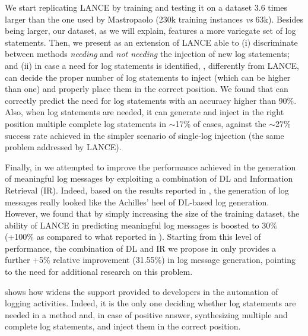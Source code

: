 We start replicating LANCE by training and testing it on a dataset 3.6 times larger than the one used by Mastropaolo \etal \cite{mastropaolo2022using} (230k training instances \emph{vs} 63k). Besides being larger, our dataset, as we will explain, features a more variegate set of log statements. Then, we present \approach as an extension of LANCE able to (i) discriminate between methods \emph{needing} and \emph{not needing} the injection of new log statements; and (ii) in case a need for log statements is identified, \approach, differently from LANCE, can decide the proper number of log statements to inject (which can be higher than one) and properly place them in the correct position. We found that \approach can correctly predict the need for log statements with an accuracy higher than 90\%. Also, when log statements are needed, it can generate and inject in the right position multiple complete log statements in $\sim$17\% of cases, against the $\sim$27\% success rate achieved in the simpler scenario of single-log injection (\ie the same problem addressed by LANCE).   

Finally, in \approach we attempted to improve the performance achieved in the generation of meaningful log messages by exploiting a combination of DL and Information Retrieval (IR). Indeed, based on the results reported in \cite{mastropaolo2022using}, the generation of log messages really looked like the Achilles' heel of DL-based log generation. However, we found that by simply increasing the size of the training dataset, the ability of LANCE in predicting meaningful log messages is boosted to 30\% (+100\% as compared to what reported in \cite{mastropaolo2022using}). Starting from this level of performance, the combination of DL and IR we propose in \approach only provides a further +5\% relative improvement (31.55\%) in log message generation, pointing to the need for additional research on this problem.

 shows how \approach widens the support provided to developers in the automation of logging activities. Indeed, it is the only one deciding whether log statements are needed in a method and, in case of positive answer, synthesizing multiple and complete log statements, and inject them in the correct position. 

